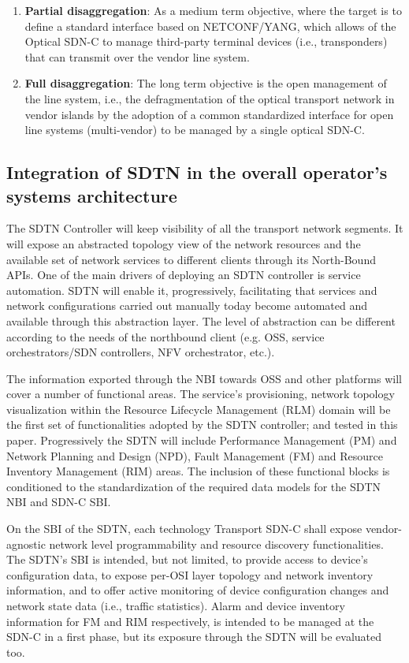 \documentclass[a4paper,fleqn]{cas-dc}
\begin{document}
\begin{enumerate}
    \item \textbf{Partial disaggregation}: As a medium term objective, where the target is to define a standard interface based on NETCONF/YANG, which allows of the Optical SDN-C to manage third-party terminal devices (i.e., transponders) that can transmit over the vendor line system.
    
    \item \textbf{Full disaggregation}: The long term objective is the open management of the line system, i.e., the defragmentation of the optical transport network in vendor islands by the adoption of a common standardized interface for open line systems (multi-vendor) to be managed by a single optical SDN-C.
\end{enumerate}

\subsection{Integration of SDTN in the overall operator’s systems architecture}
\label{section:sdtn}
The SDTN Controller will keep visibility of all the transport network segments. It will expose an abstracted topology view of the network resources and the available set of network services to different clients through its North-Bound APIs.  
One of the main drivers of deploying an SDTN controller is service automation. SDTN will enable it, progressively, facilitating that services and network configurations carried out manually today become automated and available through this abstraction layer.  The level of abstraction can be different according to the needs of the northbound client (e.g. OSS, service orchestrators/SDN controllers, NFV orchestrator, etc.). 

The information exported through the NBI towards OSS and other platforms will cover a number of functional areas. The service’s provisioning, network topology visualization within the Resource Lifecycle Management (RLM) domain will be the first set of functionalities adopted by the SDTN controller; and tested in this paper. Progressively the SDTN will include Performance Management (PM) and Network Planning and Design (NPD), Fault Management (FM) and Resource Inventory Management (RIM) areas. The inclusion of these functional blocks is conditioned to the standardization of the required data models for the SDTN NBI and SDN-C SBI.

On the SBI of the SDTN, each technology Transport SDN-C shall expose vendor-agnostic network level programmability and resource discovery functionalities. The SDTN's SBI is intended, but not limited, to provide access to device’s configuration data, to expose per-OSI layer topology and network inventory information, and to offer active monitoring of device configuration changes and network state data (i.e., traffic statistics). Alarm and device inventory information for FM and RIM respectively, is intended to be managed at the SDN-C in a first phase, but its exposure through the SDTN will be evaluated too.
\end{document}
